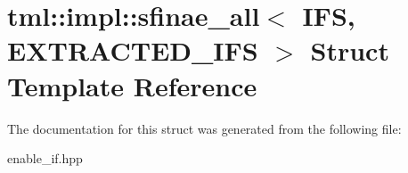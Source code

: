 \hypertarget{structtml_1_1impl_1_1sfinae__all}{\section{tml\+:\+:impl\+:\+:sfinae\+\_\+all$<$ I\+F\+S, E\+X\+T\+R\+A\+C\+T\+E\+D\+\_\+\+I\+F\+S $>$ Struct Template Reference}
\label{structtml_1_1impl_1_1sfinae__all}
}


The documentation for this struct was generated from the following file\+:\begin{DoxyCompactItemize}
\item 
enable\+\_\+if.\+hpp\end{DoxyCompactItemize}
